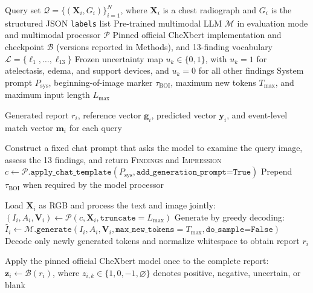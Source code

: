 \documentclass[11pt]{article}
\begin{document}
\setcounter{algorithm}{2}

\begin{algorithm}[H]
\small
\caption{Report Generation, CheXbert Labeling, and 13-Label Matching}
\begin{algorithmic}[1]

\Require Query set $\mathcal{Q}=\{(\mathbf{X}_i,G_i)\}_{i=1}^{N}$, where $\mathbf{X}_i$ is a chest radiograph and $G_i$ is the structured JSON \texttt{labels} list
\Require Pre-trained multimodal LLM $\mathcal{M}$ in evaluation mode and multimodal processor $\mathcal{P}$
\Require Pinned official CheXbert implementation and checkpoint $\mathcal{B}$ (versions reported in Methods), and 13-finding vocabulary $\mathcal{L}=\{\ell_1,\ldots,\ell_{13}\}$
\Require Frozen uncertainty map $u_k\in\{0,1\}$, with $u_k=1$ for atelectasis, edema, and support devices, and $u_k=0$ for all other findings
\Require System prompt $P_{\mathrm{sys}}$, beginning-of-image marker $\tau_{\mathrm{BOI}}$, maximum new tokens $T_{\max}$, and maximum input length $L_{\max}$

\Ensure Generated report $r_i$, reference vector $\mathbf{g}_i$, predicted vector $\mathbf{y}_i$, and event-level match vector $\mathbf{m}_i$ for each query

\State Construct a fixed chat prompt that asks the model to examine the query image, assess the 13 findings, and return \textsc{Findings} and \textsc{Impression}
\State $c\gets\mathcal{P}.\texttt{apply\_chat\_template}(P_{\mathrm{sys}},\texttt{add\_generation\_prompt=True})$
\State Prepend $\tau_{\mathrm{BOI}}$ when required by the model processor

    \State Load $\mathbf{X}_i$ as RGB and process the text and image jointly:
    \Statex \hspace{1.5em}$(I_i,A_i,\mathbf{V}_i)\gets\mathcal{P}(c,\mathbf{X}_i,\texttt{truncate}=L_{\max})$
    \State Generate by greedy decoding:
    \Statex \hspace{1.5em}$\hat{I}_i\gets\mathcal{M}.\texttt{generate}(I_i,A_i,\mathbf{V}_i,\texttt{max\_new\_tokens}=T_{\max},\texttt{do\_sample=False})$
    \State Decode only newly generated tokens and normalize whitespace to obtain report $r_i$

    \State Apply the pinned official CheXbert model once to the complete report:
    \Statex \hspace{1.5em}$\mathbf{z}_i\gets\mathcal{B}(r_i)$, where $z_{i,k}\in\{1,0,-1,\varnothing\}$ denotes positive, negative, uncertain, or blank


\end{algorithmic}
\end{algorithm}
\end{document}
